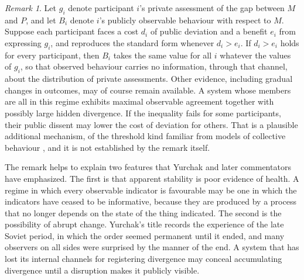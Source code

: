 \documentclass[11pt]{article}
\theoremstyle{definition}
\theoremstyle{remark}
\newtheorem{remark}{Remark}
\begin{document}
\begin{remark}
Let $g_i$ denote participant $i$'s private assessment of the gap between $M$ and $P$, and let $B_i$ denote $i$'s publicly observable behaviour with respect to $M$. Suppose each participant faces a cost $d_i$ of public deviation and a benefit $e_i$ from expressing $g_i$, and reproduces the standard form whenever $d_i > e_i$. If $d_i > e_i$ holds for every participant, then $B_i$ takes the same value for all $i$ whatever the values of $g_i$, so that observed behaviour carries no information, through that channel, about the distribution of private assessments. Other evidence, including gradual changes in outcomes, may of course remain available. A system whose members are all in this regime exhibits maximal observable agreement together with possibly large hidden divergence. If the inequality fails for some participants, their public dissent may lower the cost of deviation for others. That is a plausible additional mechanism, of the threshold kind familiar from models of collective behaviour \cite{granovetter1978}, and it is not established by the remark itself.
\end{remark}

The remark helps to explain two features that Yurchak and later commentators have emphasized. The first is that apparent stability is poor evidence of health. A regime in which every observable indicator is favourable may be one in which the indicators have ceased to be informative, because they are produced by a process that no longer depends on the state of the thing indicated. The second is the possibility of abrupt change. Yurchak's title records the experience of the late Soviet period, in which the order seemed permanent until it ended, and many observers on all sides were surprised by the manner of the end. A system that has lost its internal channels for registering divergence may conceal accumulating divergence until a disruption makes it publicly visible.
\end{document}
